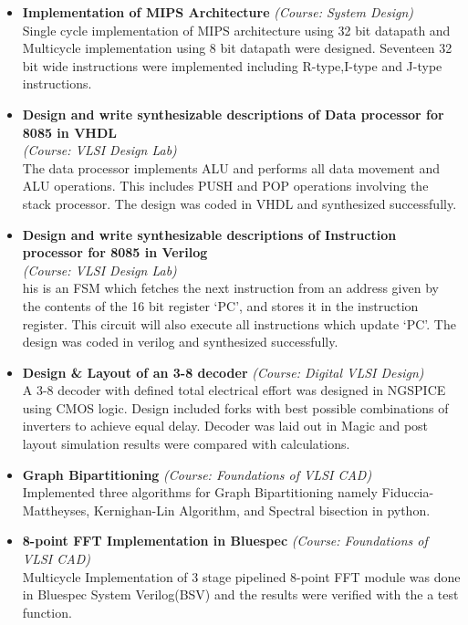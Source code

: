 \documentclass[a4paper,10pt]{article}
\begin{document}
 \begin{itemize}
  \setlength{\itemsep}{1pt}

  \item \textbf{{Implementation of MIPS Architecture}} \textit{(Course: System Design)}\\
	Single cycle implementation of MIPS architecture using 32 bit datapath and Multicycle implementation using 8 bit datapath
	were designed.	Seventeen 32 bit wide instructions were implemented including R-type,I-type and J-type instructions.
   

  \item \textbf{{Design and write synthesizable descriptions of Data processor for 8085 in VHDL}}\\ \textit{(Course: VLSI Design Lab)}\\
	The data processor  implements ALU and performs  all data movement and ALU operations.
	This includes PUSH and POP operations involving the stack processor. The design was coded in
	VHDL and synthesized successfully.
	
  \item \textbf{{Design and write synthesizable descriptions of Instruction processor for 8085 in Verilog}}\\ \textit{(Course: VLSI Design Lab)}\\
	his is an FSM which fetches the next instruction from an address given by the contents of the 16 bit register ‘PC’, 
	and stores it in the instruction register. This circuit will also execute all instructions which update ‘PC’.
	The design was coded in verilog and synthesized successfully.

  \item \textbf{{Design \& Layout of an 3-8 decoder}}   \textit{(Course: Digital VLSI Design)}\\
	A 3-8 decoder with defined total electrical effort was designed in NGSPICE using CMOS logic. Design included forks with
	best possible combinations of inverters to achieve equal delay. Decoder was laid out in Magic and post layout
	simulation results were compared with calculations.

  \item \textbf{{Graph Bipartitioning}} \textit{(Course: Foundations of VLSI CAD)}\\
	Implemented three algorithms for Graph Bipartitioning namely Fiduccia-Mattheyses, Kernighan-Lin Algorithm, and Spectral bisection
	in python.
	
  \item \textbf{{8-point FFT Implementation in Bluespec}} \textit{(Course: Foundations of VLSI CAD)}\\
	Multicycle Implementation of 3 stage pipelined 8-point FFT module was done in Bluespec System Verilog(BSV) and the results
	were verified with the a test function.
	

\end{itemize}
\end{document}
